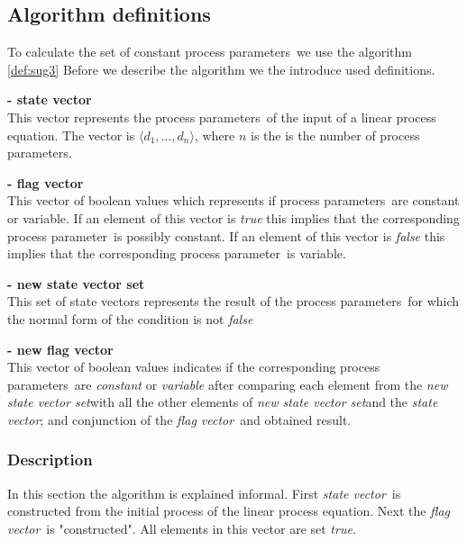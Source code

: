 \documentclass[a4paper,10pt]{article}
\theoremstyle{plain}
\theoremstyle{definition}
\newcommand{\lpe}{linear process equation}
\newcommand{\ovr}{\overrightarrow}
\newcommand{\pp}{process parameter}
\newcommand{\pps}{process parameters}
\newcommand{\ti}{\textit}
\newcommand{\sv}{\textit{state vector}}
\newcommand{\fv}{\textit{flag vector}}
\newcommand{\svs}{\textit{new state vector set}}
\begin{document}


\subsection{Algorithm definitions}
To calculate the set of constant \pps\ we use the algorithm
\ref{def:sug3} Before we describe the algorithm we the introduce
used definitions. 

\begin{defn} \textbf{- state vector} \label{sv}\\
This vector represents the \pps\ of the input of a \lpe . The vector is 
$\langle d_1, \ldots, d_n \rangle$, where $n$ is the is the number
of \pps . 
\end{defn}

\begin{defn} \textbf{- flag vector}\\
This vector of boolean values which represents if \pps\
are constant or variable. If an element of this vector is \ti{true}
this implies that the corresponding \pp\ is possibly constant. If an element
of this vector is \ti{false} this implies that the corresponding
\pp\ is variable.
\end{defn}

\begin{defn} \textbf{- new state vector set}\\
 This set of state vectors represents the result of the
\pps\ for which the normal form of the condition is not \ti{false}
\end{defn} 

\begin{defn}
\textbf{- new flag vector} \\
This vector of boolean values indicates if the
corresponding \pps\ are \ti{constant} or \ti{variable} after comparing each element from the \svs with all the other elements of \svs  and the \sv; and conjunction of the \fv\ and obtained result. 
\end{defn}

\subsubsection{Description}\label{sss:desc}
In this section the algorithm is explained informal. First \sv\ is constructed from the initial process of the \lpe . Next the \fv\ is "constructed".
All elements in this vector are set \ti{true}.
\end{document}

